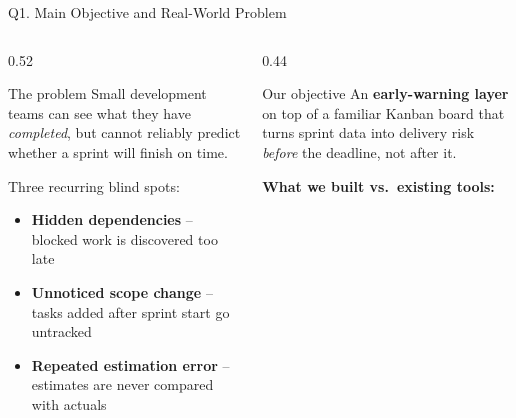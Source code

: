 \documentclass[11pt,aspectratio=169]{beamer}
\begin{document}
\begin{frame}{Q1. Main Objective and Real-World Problem}
  \begin{columns}[T]
    \begin{column}{0.52\textwidth}
      \begin{block}{The problem}
        Small development teams can see what they have \emph{completed}, but cannot
        reliably predict whether a sprint will finish on time.
      \end{block}
      \vspace{0.1cm}
      Three recurring blind spots:
      \begin{itemize}
        \item \textbf{Hidden dependencies} -- blocked work is discovered too late
        \item \textbf{Unnoticed scope change} -- tasks added after sprint start go untracked
        \item \textbf{Repeated estimation error} -- estimates are never compared with actuals
      \end{itemize}
      \vspace{0.2cm}
    \end{column}
    \begin{column}{0.44\textwidth}
      \begin{alertblock}{Our objective}
        An \textbf{early-warning layer} on top of a familiar Kanban board that
        turns sprint data into delivery risk \emph{before} the deadline, not after it.
      \end{alertblock}
      \vspace{0.25cm}
      \textbf{What we built vs.\ existing tools:}
      \vspace{0.1cm}


\end{column}
\end{columns}
\end{frame}
\end{document}
